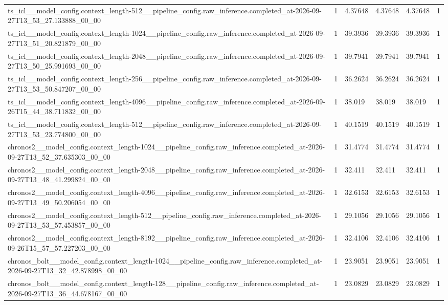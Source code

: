 \begin{tabular}{llllll}
ts\_icl\_\_model\_config.context\_length-512\_\_pipeline\_config.raw\_inference.completed\_at-2026-09-27T13\_53\_27.133888\_00\_00 & 1 & 4.37648 & 4.37648 & 4.37648 & 1 \\
ts\_icl\_\_model\_config.context\_length-1024\_\_pipeline\_config.raw\_inference.completed\_at-2026-09-27T13\_51\_20.821879\_00\_00 & 1 & 39.3936 & 39.3936 & 39.3936 & 1 \\
ts\_icl\_\_model\_config.context\_length-2048\_\_pipeline\_config.raw\_inference.completed\_at-2026-09-27T13\_50\_25.991693\_00\_00 & 1 & 39.7941 & 39.7941 & 39.7941 & 1 \\
ts\_icl\_\_model\_config.context\_length-256\_\_pipeline\_config.raw\_inference.completed\_at-2026-09-27T13\_53\_50.847207\_00\_00 & 1 & 36.2624 & 36.2624 & 36.2624 & 1 \\
ts\_icl\_\_model\_config.context\_length-4096\_\_pipeline\_config.raw\_inference.completed\_at-2026-09-26T15\_44\_38.711832\_00\_00 & 1 & 38.019 & 38.019 & 38.019 & 1 \\
ts\_icl\_\_model\_config.context\_length-512\_\_pipeline\_config.raw\_inference.completed\_at-2026-09-27T13\_53\_23.774800\_00\_00 & 1 & 40.1519 & 40.1519 & 40.1519 & 1 \\
chronos2\_\_model\_config.context\_length-1024\_\_pipeline\_config.raw\_inference.completed\_at-2026-09-27T13\_52\_37.635303\_00\_00 & 1 & 31.4774 & 31.4774 & 31.4774 & 1 \\
chronos2\_\_model\_config.context\_length-2048\_\_pipeline\_config.raw\_inference.completed\_at-2026-09-27T13\_48\_41.299824\_00\_00 & 1 & 32.411 & 32.411 & 32.411 & 1 \\
chronos2\_\_model\_config.context\_length-4096\_\_pipeline\_config.raw\_inference.completed\_at-2026-09-27T13\_49\_50.206054\_00\_00 & 1 & 32.6153 & 32.6153 & 32.6153 & 1 \\
chronos2\_\_model\_config.context\_length-512\_\_pipeline\_config.raw\_inference.completed\_at-2026-09-27T13\_53\_57.453857\_00\_00 & 1 & 29.1056 & 29.1056 & 29.1056 & 1 \\
chronos2\_\_model\_config.context\_length-8192\_\_pipeline\_config.raw\_inference.completed\_at-2026-09-26T15\_57\_57.227203\_00\_00 & 1 & 32.4106 & 32.4106 & 32.4106 & 1 \\
chronos\_bolt\_\_model\_config.context\_length-1024\_\_pipeline\_config.raw\_inference.completed\_at-2026-09-27T13\_32\_42.878998\_00\_00 & 1 & 23.9051 & 23.9051 & 23.9051 & 1 \\
chronos\_bolt\_\_model\_config.context\_length-128\_\_pipeline\_config.raw\_inference.completed\_at-2026-09-27T13\_36\_44.678167\_00\_00 & 1 & 23.0829 & 23.0829 & 23.0829 & 1 \\

\end{tabular}
